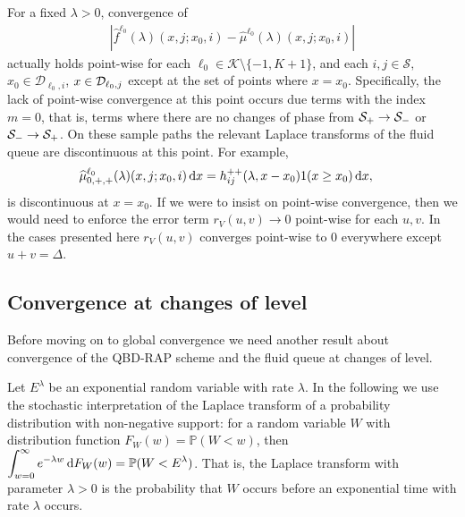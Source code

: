 
\begin{rem}\label{rem: point wies}
	For a fixed \(\lambda > 0\), convergence of 
	\begin{align}
		\left|\widehat f^{\ell_0}(\lambda)(x,j;x_0,i) - \widehat \mu^{\ell_0}(\lambda)( x,j; x_0,i) \right|
	\end{align}
	actually holds point-wise for each \(\ell_0\in\mathcal K\setminus\{-1,K+1\}\), and each \(i,j\in\mathcal S,\) \(x_0\in\mathcal D_{\ell_0,i}\), \(x\in\mathcal{D}_{\ell_0,j}\) except at the set of points where \(x=x_0\). Specifically, the lack of point-wise convergence at this point occurs due terms with the index \(m=0\), that is, terms where there are no changes of phase from \(\mathcal{S}_+\to\mathcal{S}_-\) or \(\mathcal{S}_-\to \mathcal{S}_+\). On these sample paths the relevant Laplace transforms of the fluid queue are discontinuous at this point. For example, 
	\begin{align*}
		\widehat \mu^{\ell_0}_{0,+,+}(\lambda)( x,j;x_0,i) \, \mathrm{d} x&= h_{ij}^{++}(\lambda,x-x_0)1(x\geq x_0)\, \mathrm{d} x,
	\end{align*}
	is discontinuous at \(x=x_0\). If we were to insist on point-wise convergence, then we would need to enforce the error term \(r_V(u,v)\to 0\) point-wise for each \(u,v\). In the cases presented here \(r_V(u,v)\) converges point-wise to 0 everywhere except \(u+v=\Delta\). 
\end{rem}

\subsection{Convergence at changes of level} Before moving on to global convergence we need another result about convergence of the QBD-RAP scheme and the fluid queue at changes of level. 

Let \(E^\lambda\) be an exponential random variable with rate \(\lambda\). In the following we use the stochastic interpretation of the Laplace transform of a probability distribution with non-negative support: for a random variable \(W\) with distribution function \(F_W(w)= \mathbb P(W<w)\), then \(\displaystyle\int_{w=0}^\infty e^{-\lambda w} \, \mathrm{d} F_W(w) = \mathbb P(W < E^{\lambda})\). That is, the Laplace transform with parameter \(\lambda >0\) is the probability that \(W\) occurs before an exponential time with rate \(\lambda\) occurs. 

